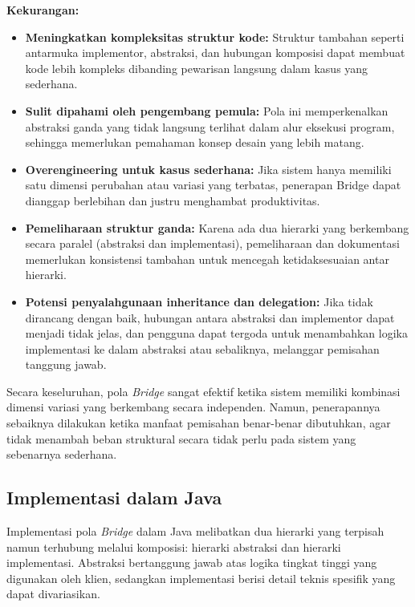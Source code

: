 \textbf{Kekurangan:}
\begin{itemize}
	\item \textbf{Meningkatkan kompleksitas struktur kode:} Struktur tambahan seperti antarmuka implementor, abstraksi, dan hubungan komposisi dapat membuat kode lebih kompleks dibanding pewarisan langsung dalam kasus yang sederhana.
	
	\item \textbf{Sulit dipahami oleh pengembang pemula:} Pola ini memperkenalkan abstraksi ganda yang tidak langsung terlihat dalam alur eksekusi program, sehingga memerlukan pemahaman konsep desain yang lebih matang.
	
	\item \textbf{Overengineering untuk kasus sederhana:} Jika sistem hanya memiliki satu dimensi perubahan atau variasi yang terbatas, penerapan Bridge dapat dianggap berlebihan dan justru menghambat produktivitas.
	
	\item \textbf{Pemeliharaan struktur ganda:} Karena ada dua hierarki yang berkembang secara paralel (abstraksi dan implementasi), pemeliharaan dan dokumentasi memerlukan konsistensi tambahan untuk mencegah ketidaksesuaian antar hierarki.
	
	\item \textbf{Potensi penyalahgunaan inheritance dan delegation:} Jika tidak dirancang dengan baik, hubungan antara abstraksi dan implementor dapat menjadi tidak jelas, dan pengguna dapat tergoda untuk menambahkan logika implementasi ke dalam abstraksi atau sebaliknya, melanggar pemisahan tanggung jawab.
\end{itemize}

Secara keseluruhan, pola \textit{Bridge} sangat efektif ketika sistem memiliki kombinasi dimensi variasi yang berkembang secara independen. Namun, penerapannya sebaiknya dilakukan ketika manfaat pemisahan benar-benar dibutuhkan, agar tidak menambah beban struktural secara tidak perlu pada sistem yang sebenarnya sederhana.

\subsection{Implementasi dalam Java}

Implementasi pola \textit{Bridge} dalam Java melibatkan dua hierarki yang terpisah namun terhubung melalui komposisi: hierarki abstraksi dan hierarki implementasi. Abstraksi bertanggung jawab atas logika tingkat tinggi yang digunakan oleh klien, sedangkan implementasi berisi detail teknis spesifik yang dapat divariasikan.


